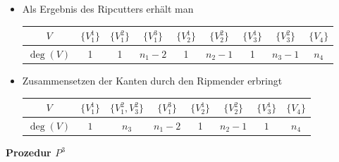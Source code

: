 \documentclass[12pt,titlepage,twoside,cleardoublepage]{article}
\theoremstyle{nummermitklammern}
\numberwithin{equation}{section}
\begin{document}
\begin{itemize}
\item Als Ergebnis des Ripcutters erhält man
\begin{center}
\begin{tabular}{|c|c|c|c|c|c|c|c|c|}
\hline
  \textbf{$V$} & $\{V_1^1\}$ & $\{V_1^2\}$ & $\{V_1^3\}$ & $\{V_2^1\}$ & $\{V_2^2\} $ & $\{V_3^1\}$ & $\{V_3^2\}$& $\{V_4\}$\\ 
  \hline
   \textbf{$\deg(V)$} & 1 & 1 & $n_1-2$ &1& $n_2-1$ & 1 & $n_3-1$ & $n_4$ \\  
   \hline
 \end{tabular}
 \end{center}
\item Zusammensetzen der Kanten durch den Ripmender erbringt
\begin{center}
\begin{tabular}{|c|c|c|c|c|c|c|c|}
\hline
  \textbf{$V$} & $\{V_1^1\}$ & $\{V_1^2,V_3^2\}$ & $\{V_1^3\}$ & $\{V_2^1\}$ & $\{V_2^2\} $ & $\{V_3^1\}$ & $\{V_4\}$\\ 
  \hline
   \textbf{$\deg(V)$} & $1$ & $n_3$ & $n_1-2$ &1& $n_2-1$ & $1$ & $n_4$ \\  
   \hline
 \end{tabular}
 \end{center}
 \end{itemize}
\textbf{Prozedur $P^3$}
\end{document}
